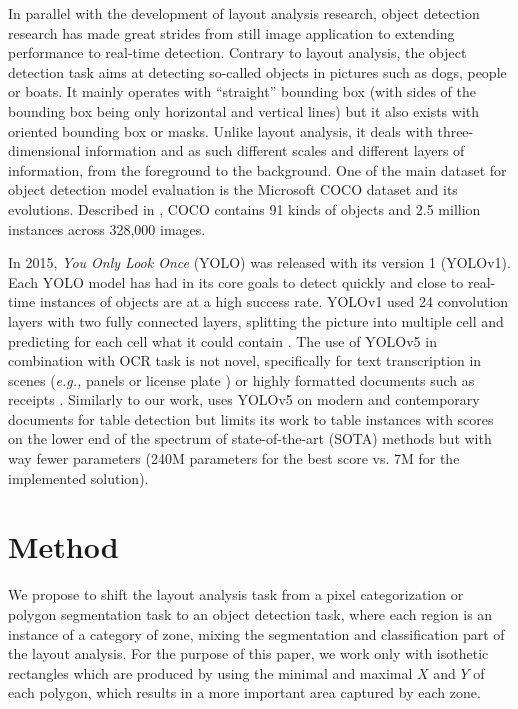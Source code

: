 \documentclass{jdmdh}
\begin{document}
In parallel with the development of layout analysis research, object detection research has made great strides from still image application to extending performance to real-time detection. Contrary to layout analysis, the object detection task aims at detecting so-called objects in pictures such as dogs, people or boats. It mainly operates with ``straight'' bounding box (with sides of the bounding box being only horizontal and vertical lines) but it also exists with oriented bounding box or masks. Unlike layout analysis, it deals with three-dimensional information and as such different scales and different layers of information, from the foreground to the background. One of the main dataset for object detection model evaluation is the Microsoft COCO dataset and its evolutions. Described in \citet{lin2014microsoft}, COCO contains 91 kinds of objects and 2.5 million instances across 328,000 images.

In 2015, \textit{You Only Look Once} (YOLO) was released with its version 1 (YOLOv1). Each YOLO model has had in its core goals to detect quickly and close to real-time instances of objects are at a high success rate. YOLOv1 used 24 convolution layers with two fully connected layers, splitting the picture into multiple cell and predicting for each cell what it could contain \citep{jiang2022a}. The use of YOLOv5 \citep{jocher2022ultralytics} in combination with OCR task is not novel, specifically for text transcription in scenes (\textit{e.g., }panels or license plate \citep{raj2022license}) or highly formatted documents such as receipts \citep{lin2022automatic}. Similarly to our work, \citet{ning2021mt} uses YOLOv5 on modern and contemporary documents for table detection but limits its work to table instances with scores on the lower end of the spectrum of state-of-the-art (SOTA) methods but with way fewer parameters (240M parameters for the best score vs. 7M for the implemented solution).


\section{Method}

We propose to shift the layout analysis task from a pixel categorization or polygon segmentation task to an object detection task, where each region is an instance of a category of zone, mixing the segmentation and classification part of the layout analysis. For the purpose of this paper, we work only with isothetic rectangles which are produced by using the minimal and maximal $X$ and $Y$ of each polygon, which results in a more important area captured by each zone. 
\end{document}
